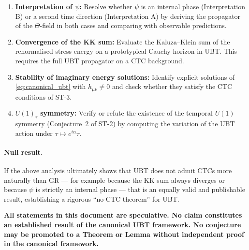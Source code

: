 \documentclass[12pt]{article}
\begin{document}
\begin{enumerate}
  \item \textbf{Interpretation of $\psi$:}  Resolve whether $\psi$ is an
    internal phase (Interpretation B) or a second time direction
    (Interpretation A) by deriving the propagator of the $\Theta$-field
    in both cases and comparing with observable predictions.
  \item \textbf{Convergence of the KK sum:}  Evaluate the Kaluza–Klein
    sum of the renormalised stress-energy on a prototypical Cauchy horizon
    in UBT.  This requires the full UBT propagator on a CTC background.
  \item \textbf{Stability of imaginary energy solutions:}  Identify
    explicit solutions of \eqref{eq:canonical_ubt} with $h_{\mu\nu} \neq 0$
    and check whether they satisfy the CTC conditions of ST-3.
  \item \textbf{$U(1)_\tau$ symmetry:}  Verify or refute the existence
    of the temporal $U(1)$ symmetry (Conjecture~2 of ST-2) by computing
    the variation of the UBT action under $\tau \mapsto e^{i\alpha}\tau$.
\end{enumerate}

\paragraph{Null result.}
If the above analysis ultimately shows that UBT does not admit CTCs more
naturally than GR — for example because the KK sum always diverges or
because $\psi$ is strictly an internal phase — that is an equally valid
and publishable result, establishing a rigorous ``no-CTC theorem'' for
UBT.

\medskip
\noindent\textbf{All statements in this document are speculative.  No
claim constitutes an established result of the canonical UBT framework.
No conjecture may be promoted to a Theorem or Lemma without independent
proof in the canonical framework.}
\end{document}
